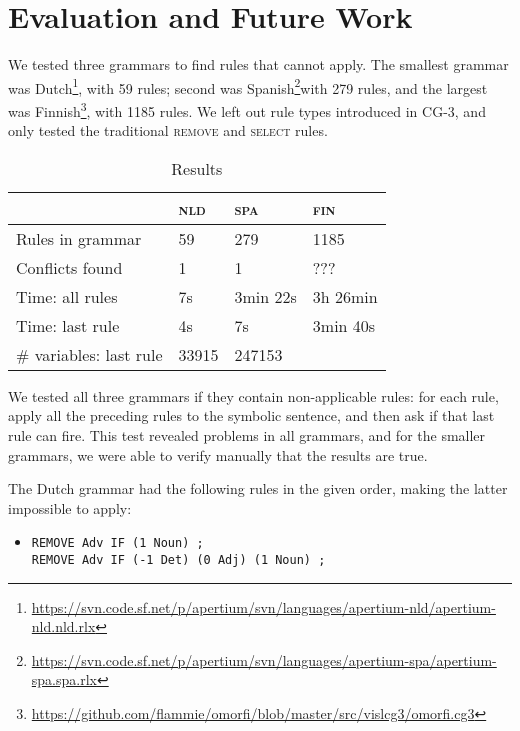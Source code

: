 \section{Evaluation and Future Work}
\label{sec:eval}

We tested three grammars to find rules that cannot apply. The smallest grammar was Dutch\footnote{\url{https://svn.code.sf.net/p/apertium/svn/languages/apertium-nld/apertium-nld.nld.rlx}}, with 59 rules; second was Spanish\footnote{\url{https://svn.code.sf.net/p/apertium/svn/languages/apertium-spa/apertium-spa.spa.rlx}}with 279 rules, and the largest was Finnish\footnote{\url{https://github.com/flammie/omorfi/blob/master/src/vislcg3/omorfi.cg3}}, with 1185 rules. We left out rule types introduced in CG-3, and only tested the traditional \textsc{remove} and \textsc{select} rules.

\begin{table}[]
\centering
\begin{tabular}{|l|l|l|l|}
\hline
                      & \textsc{nld}  & \textsc{spa}  & \textsc{fin}  \\ \hline
Rules in grammar      & 59              & 279               & 1185     \\ \hline
Conflicts found       & 1               & 1                 & ???    \\ \hline
Time: all rules       & 7s              & 3min 22s          & 3h 26min    \\ \hline
Time: last rule       & 4s              & 7s                & 3min 40s    \\ \hline
\# variables: last rule & 33915         & 247153            &    \\ \hline
\end{tabular}
\caption{Results}
\label{table:res}
\end{table}

We tested all three grammars if they contain non-applicable rules:
for each rule, apply all the preceding rules to the symbolic sentence, and then ask if that last rule can fire.
This test revealed problems in all grammars, and for the smaller grammars, we were able to verify manually that the results are true.

The Dutch grammar had the following rules in the given order, making the latter impossible to apply:

\begin{itemize}
\item[] 
\begin{verbatim}REMOVE Adv IF (1 Noun) ;
REMOVE Adv IF (-1 Det) (0 Adj) (1 Noun) ;
\end{verbatim}
\end{itemize}

